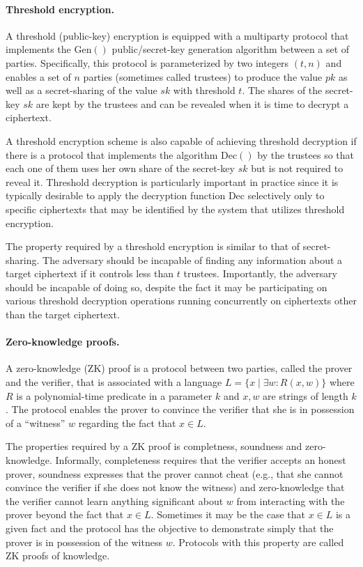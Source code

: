 \paragraph{Threshold encryption.} A threshold (public-key) encryption
is equipped with a multiparty protocol that implements the
$\mathrm{Gen}()$ public/secret-key generation algorithm between a set
of parties. Specifically, this protocol is parameterized by two
integers $(t,n)$ and enables a set of $n$ parties (sometimes called
trustees) to produce the value $pk$ as well as a secret-sharing of the
value $sk$ with threshold $t$. The shares of the secret-key $sk$ are
kept by the trustees and can be revealed when it is time to decrypt a
ciphertext.

A threshold encryption scheme is also capable of achieving threshold
decryption if there is a protocol that implements the algorithm
$\mathrm{Dec}()$ by the trustees so that each one of them uses her own
share of the secret-key $sk$ but is not required to reveal it.
Threshold decryption is particularly important in practice since it is
typically desirable to apply the decryption function $\mathrm{Dec}$
selectively only to specific ciphertexts that may be identified by the
system that utilizes threshold encryption.

The property required by a threshold encryption is similar to that of
secret-sharing.  The adversary should be incapable of finding any
information about a target ciphertext if it controls less than $t$
trustees. Importantly, the adversary should be incapable of doing so,
despite the fact it may be participating on various threshold
decryption operations running concurrently on ciphertexts other than
the target ciphertext.

\paragraph{Zero-knowledge proofs.} A zero-knowledge (ZK) proof is a
protocol between two parties, called the prover and the verifier, that
is associated with a language $L = \{x \mid \exists w : R(x,w)\}$
where $R$ is a polynomial-time predicate in a parameter $k$ and $x,w$
are strings of length $k$.  The protocol enables the prover to
convince the verifier that she is in possession of a ``witness'' $w$
regarding the fact that $x\in L$.

The properties required by a ZK proof is completness, soundness and
zero-knowledge.  Informally, completeness requires that the verifier
accepts an honest prover, soundness expresses that the prover cannot
cheat (e.g., that she cannot convince the verifier if she does not
know the witness) and zero-knowledge that the verifier cannot learn
anything significant about $w$ from interacting with the prover beyond
the fact that $x\in L$. Sometimes it may be the case that $x\in L$ is
a given fact and the protocol has the objective to demonstrate simply
that the prover is in possession of the witness $w$.  Protocols with
this property are called ZK proofs of knowledge.

